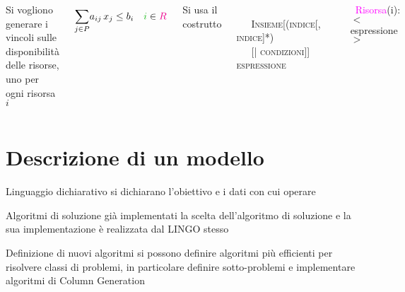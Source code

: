 \documentclass{beamer}
\newcommand{\noun}[1]{\textsc{#1}}
\def\lyxframeend{} %
\begin{document}
\lyxframeend{}
\begin{columns}%


\column{5cm}


{\small Si vogliono generare i vincoli sulle disponibilit\`a delle
risorse, uno per ogni risorsa $i$}\bigskip{}



{\Large  \begin{equation*}   {\displaystyle \sum_{j\in P}} a_{ij} \, x_{j} \leq b_{i} \quad {\color{green!70!black} i}\in {\color{magenta} R}  \end{equation*} }


\column{6cm}


{\small Si usa il costrutto

 }\\
\ \ \ \noun{\small Insieme}{\small {[}(}\noun{\small indice}{\small {[},
}\noun{\small indice}{\small {]}{*})\\
\ \ \ {[}| }\noun{\small condizioni}{\small {]]}\structure{{\small :}}
}\noun{\small espressione}{\small\\
\structure{{\small );}}}{\small \par}
\begin{columns}%
\bigskip{}

\end{columns}%

\textcolor{magenta}{\ Risorsa}(\textcolor{green!70!black}{i}): $<$espressione$>$\structure{);}

\end{columns}%

\lyxframeend{}\section{Descrizione di un modello}


\lyxframeend{}

\begin{block}{Linguaggio dichiarativo}
si dichiarano l'obiettivo e i dati con cui operare
\end{block}

\begin{block}{Algoritmi di soluzione gi\`a implementati}
la scelta dell'algoritmo di soluzione e la sua implementazione \`e
realizzata dal LINGO stesso
\end{block}

\begin{block}{Definizione di nuovi algoritmi}
si possono definire algoritmi più efficienti per risolvere classi di problemi,
in particolare definire sotto-problemi e implementare algoritmi di Column
Generation
\end{block}
\end{document}
